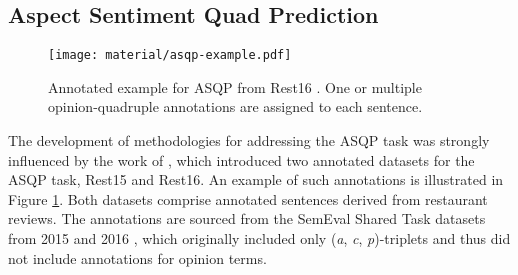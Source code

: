 
\subsection{Aspect Sentiment Quad Prediction}

\begin{figure}[ht]
    \centering
    \texttt{[image: material/asqp-example.pdf]}
    \caption{Annotated example for ASQP from Rest16 \citep{zhang2021aspect}. One or multiple opinion-quadruple annotations are assigned to each sentence.}
    \label{fig:zhang-asqp-example}
\end{figure}


The development of methodologies for addressing the ASQP task was strongly influenced by the work of \citet{zhang2021aspect}, which introduced two annotated datasets for the ASQP task, Rest15 and Rest16. An example of such annotations is illustrated in Figure \ref{fig:zhang-asqp-example}. Both datasets comprise annotated sentences derived from restaurant reviews. The annotations are sourced from the SemEval Shared Task datasets from 2015 and 2016 
\citep{pontiki2015semeval,pontiki2016semeval}, which originally included only (\textit{a}, \textit{c}, \textit{p})-triplets and thus did not include annotations for opinion terms. 

